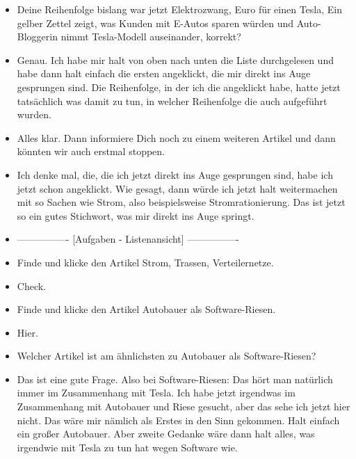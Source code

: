{\begin{itemize}[]
    Nachdem ich die durch habe, würde ich dann halt in Richtung Strom gehen.
    Das wäre so mein Vorgehen, dass ich halt zuerst das, was wirklich direkt sich ums Auto dreht, anklicke und dann im Nachhinein halt alles, was mehr oder weniger indirekt damit zu tun hat.
    \item {} Deine Reihenfolge bislang war jetzt \flqq Elektrozwang\frqq{},  Euro für einen Tesla\frqq{}, \flqq Ein gelber Zettel zeigt, was Kunden mit E-Autos sparen würden\frqq{} und \flqq Auto-Bloggerin nimmt Tesla-Modell auseinander\frqq{}, korrekt?
    \item {} Genau.
    Ich habe mir halt von oben nach unten die Liste durchgelesen und habe dann halt einfach die ersten angeklickt, die mir direkt ins Auge gesprungen sind.
    Die Reihenfolge, in der ich die angeklickt habe, hatte jetzt tatsächlich was damit zu tun, in welcher Reihenfolge die auch aufgeführt wurden.
    \item {} Alles klar. Dann informiere Dich noch zu einem weiteren Artikel und dann könnten wir auch erstmal stoppen.
    \item {} Ich denke mal, die, die ich jetzt direkt ins Auge gesprungen sind, habe ich jetzt schon angeklickt.
    Wie gesagt, dann würde ich jetzt halt weitermachen mit so Sachen wie Strom, also beispielsweise \flqq Stromrationierung\frqq{}. 
    Das ist jetzt so ein gutes Stichwort, was mir direkt ins Auge springt.
    \item {----------------} [Aufgaben - Listenansicht] {----------------}
    \item {} Finde und klicke den Artikel \flqq Strom, Trassen, Verteilernetze\frqq{}.
    \item {} Check.
    \item {} Finde und klicke den Artikel \flqq Autobauer als Software-Riesen\frqq{}.
    \item {} Hier.
    \item {} Welcher Artikel ist am ähnlichsten zu \flqq Autobauer als Software-Riesen\frqq{}?
    \item {} Das ist eine gute Frage. 
    Also bei Software-Riesen: Das hört man natürlich immer im Zusammenhang mit Tesla.
    Ich habe jetzt irgendwas im Zusammenhang mit Autobauer und Riese gesucht, aber das sehe ich jetzt hier nicht.
    Das wäre mir nämlich als Erstes in den Sinn gekommen.
    Halt einfach ein großer Autobauer.
    Aber zweite Gedanke wäre dann halt alles, was irgendwie mit Tesla zu tun hat wegen Software wie.

\end{itemize}}
